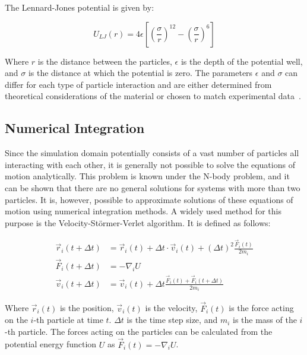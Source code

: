 The Lennard-Jones potential is given by:

\begin{equation}
      U_{LJ}(r) = 4 \epsilon \left[ \left( \frac{\sigma}{r} \right)^{12} - \left( \frac{\sigma}{r} \right)^6 \right]
\end{equation}


Where $r$ is the distance between the particles, $\epsilon$ is the depth of the potential well, and $\sigma$ is the distance at which the potential is zero. The parameters $\epsilon$ and $\sigma$ can differ for each type of particle interaction and are either determined from theoretical considerations of the material or chosen to match experimental data~\cite{Maghfiroh2020}.


\subsection{Numerical Integration}

Since the simulation domain potentially consists of a vast number of particles all interacting with each other, it is generally not possible to solve the equations of motion analytically. This problem is known under the N-body problem, and it can be shown that there are no general solutions for systems with more than two particles. It is, however, possible to approximate solutions of these equations of motion using numerical integration methods. A widely used method for this purpose is the Velocity-Störmer-Verlet algorithm. It is defined as follows:

\begin{align}
      \vec{r}_i(t + \Delta t) & = \vec{r}_i(t) + \Delta t \cdot \vec{v}_i(t) + (\Delta t)^2 \frac{\vec{F}_i(t)}{2m_i} \label{eq:verlet_position} \\
      \vec{F}_i(t + \Delta t) & = -\nabla_i U \label{eq:verlet_force}                                                                            \\
      \vec{v}_i(t + \Delta t) & = \vec{v}_i(t) + \Delta t  \frac{\vec{F}_i(t) + \vec{F}_i(t + \Delta t)}{2m_i} \label{eq:verlet_velocity}
\end{align}

Where $\vec{r}_i(t)$ is the position, $\vec{v}_i(t)$ is the velocity, $\vec{F}_i(t)$ is the force acting on the $i$-th particle at time $t$. $\Delta t$ is the time step size, and $m_i$ is the mass of the $i$-th particle. The forces acting on the particles can be calculated from the potential energy function $U$ as $\vec{F}_i(t) = -\nabla_i U$.

